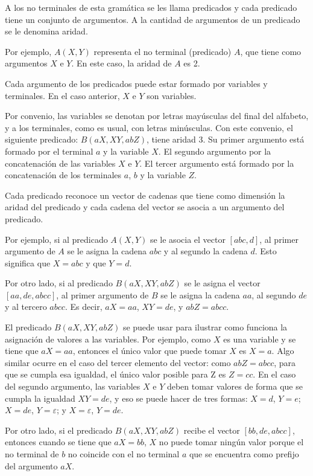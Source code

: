 A los no terminales de esta gramática se les llama predicados y cada predicado tiene un conjunto de argumentos. 
A la cantidad de argumentos de un predicado se le denomina aridad.

Por ejemplo, $A(X,Y)$ representa el no terminal (predicado) $A$, que tiene como argumentos $X$ e $Y$. En este caso, la aridad de $A$ es 2.

Cada argumento de los predicados puede estar formado por variables y terminales. En el caso anterior, $X$ e $Y$ son variables.

Por convenio, las variables se denotan por letras mayúsculas del final del alfabeto, y a los terminales, como es 
usual, con letras minúsculas. Con este convenio, el siguiente predicado: $B(aX, XY, abZ)$, tiene aridad 3. Su 
primer argumento está formado por el terminal $a$ y la variable $X$. El segundo argumento por la concatenación 
de las variables $X$ e $Y$. El tercer argumento está formado por la concatenación de los terminales $a$, $b$ y 
la variable $Z$. 

Cada predicado reconoce un vector de cadenas que tiene como dimensión la aridad del predicado y cada cadena del vector se asocia a un argumento del predicado.

Por ejemplo, si al predicado $A(X,Y)$ se le asocia el vector $[abc,d]$, al primer argumento de $A$ se le asigna
la cadena $abc$ y al segundo la cadena $d$. Esto significa que $X=abc$ y que $Y=d$.

Por otro lado, si al predicado $B(aX, XY, abZ)$ se le asigna el vector $[aa,de,abcc]$,
al primer argumento de $B$ se le asigna la cadena $aa$, al segundo $de$ y al tercero $abcc$. Es decir, $aX=aa$, $XY=de$, y $abZ=abcc$.

El predicado $B(aX, XY, abZ)$ se puede usar para ilustrar como funciona la asignación de valores a las variables.
Por ejemplo, como $X$ es una variable y se tiene que $aX=aa$, entonces el único valor que puede tomar $X$ es $X=a$. 
Algo similar ocurre en el caso del tercer elemento del vector: como $abZ=abcc$, para que se cumpla esa igualdad, 
el único valor posible para Z es $Z=cc$. En el caso del segundo argumento, las variables $X$ e $Y$ deben tomar valores 
de forma que se cumpla la igualdad $XY=de$, y eso se puede hacer de tres formas: $X=d$, $Y=e$; $X=de$, $Y=\varepsilon$; 
y $X=\varepsilon$, $Y=de$. 

Por otro lado, si el predicado $B(aX, XY, abZ)$ recibe el vector $[bb,de,abcc]$, entonces cuando se tiene que $aX=bb$,
$X$ no puede tomar ningún valor porque el no terminal de $b$ no coincide con el no terminal $a$ que se encuentra como 
prefijo del argumento $aX$.

